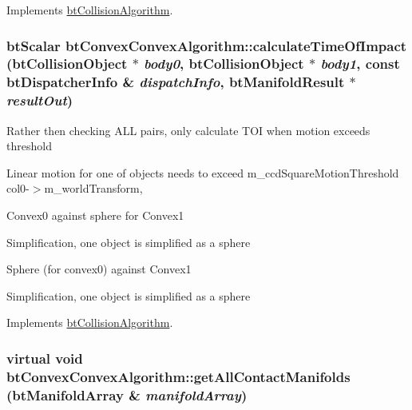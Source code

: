 Implements \hyperlink{classbt_collision_algorithm}{btCollisionAlgorithm}.\hypertarget{classbt_convex_convex_algorithm_55f817b690c4e858d2b02607b382ce6b}{
\subsubsection[calculateTimeOfImpact]{\setlength{\rightskip}{0pt plus 5cm}btScalar btConvexConvexAlgorithm::calculateTimeOfImpact (btCollisionObject $\ast$ {\em body0}, \/  btCollisionObject $\ast$ {\em body1}, \/  const btDispatcherInfo \& {\em dispatchInfo}, \/  {\bf btManifoldResult} $\ast$ {\em resultOut})}}
\label{classbt_convex_convex_algorithm_55f817b690c4e858d2b02607b382ce6b}




Rather then checking ALL pairs, only calculate TOI when motion exceeds threshold

Linear motion for one of objects needs to exceed m\_\-ccdSquareMotionThreshold col0-$>$m\_\-worldTransform,

Convex0 against sphere for Convex1

Simplification, one object is simplified as a sphere

Sphere (for convex0) against Convex1

Simplification, one object is simplified as a sphere 

Implements \hyperlink{classbt_collision_algorithm}{btCollisionAlgorithm}.\hypertarget{classbt_convex_convex_algorithm_a2a195cdd3b45c169c15ea2de85c4038}{
\subsubsection[getAllContactManifolds]{\setlength{\rightskip}{0pt plus 5cm}virtual void btConvexConvexAlgorithm::getAllContactManifolds ({\bf btManifoldArray} \& {\em manifoldArray})}}
\label{classbt_convex_convex_algorithm_a2a195cdd3b45c169c15ea2de85c4038}




